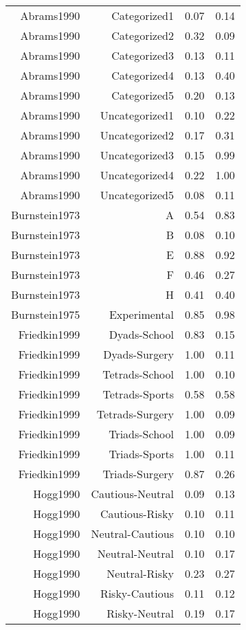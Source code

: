 \begin{longtable}{rrcc}
Abrams1990 & Categorized1 & 0.07 & 0.14\\
Abrams1990 & Categorized2 & 0.32 & 0.09\\
Abrams1990 & Categorized3 & 0.13 & 0.11\\
Abrams1990 & Categorized4 & 0.13 & 0.40\\
Abrams1990 & Categorized5 & 0.20 & 0.13\\
Abrams1990 & Uncategorized1 & 0.10 & 0.22\\
Abrams1990 & Uncategorized2 & 0.17 & 0.31\\
Abrams1990 & Uncategorized3 & 0.15 & 0.99\\
Abrams1990 & Uncategorized4 & 0.22 & 1.00\\
Abrams1990 & Uncategorized5 & 0.08 & 0.11\\
\addlinespace
Burnstein1973 & A & 0.54 & 0.83\\
Burnstein1973 & B & 0.08 & 0.10\\
Burnstein1973 & E & 0.88 & 0.92\\
Burnstein1973 & F & 0.46 & 0.27\\
Burnstein1973 & H & 0.41 & 0.40\\
\addlinespace
Burnstein1975 & Experimental & 0.85 & 0.98\\
\addlinespace
Friedkin1999 & Dyads-School & 0.83 & 0.15\\
Friedkin1999 & Dyads-Surgery & 1.00 & 0.11\\
Friedkin1999 & Tetrads-School & 1.00 & 0.10\\
Friedkin1999 & Tetrads-Sports & 0.58 & 0.58\\
Friedkin1999 & Tetrads-Surgery & 1.00 & 0.09\\
Friedkin1999 & Triads-School & 1.00 & 0.09\\
Friedkin1999 & Triads-Sports & 1.00 & 0.11\\
Friedkin1999 & Triads-Surgery & 0.87 & 0.26\\
\addlinespace
Hogg1990 & Cautious-Neutral & 0.09 & 0.13\\
Hogg1990 & Cautious-Risky & 0.10 & 0.11\\
Hogg1990 & Neutral-Cautious & 0.10 & 0.10\\
Hogg1990 & Neutral-Neutral & 0.10 & 0.17\\
Hogg1990 & Neutral-Risky & 0.23 & 0.27\\
Hogg1990 & Risky-Cautious & 0.11 & 0.12\\
Hogg1990 & Risky-Neutral & 0.19 & 0.17\\

\end{longtable}

